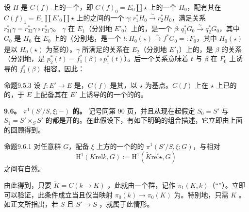设 $H$ 是 $C(f)$ 上的一个，即 $C(f)_0=E_0\amalg\star$ 上的一个 $H_0$，配有其在 $C(f)_1=E_1\amalg E'_0\amalg\star$ 上的之间的一个 $\gamma:r_1^*H_0\xrightarrow\sim r_2^*H_0$，满足关系 $r_{31}^*\gamma=r_{32}^*\gamma\circ r_{21}^*\gamma$。
 $\gamma$ 在 $E_1$（分别地 $E'_0$）上的，是一个 $\beta:q_1^*G_0\xrightarrow\sim q_2^*G_0$，其中 $G_0$ 是 $H_0$ 在 $E_0$ 上的（分别地，是一个 $t:\underline{H_0(\star)}\xrightarrow\sim f^*G_0=:F_0$，其中 $\underline{H_0(\star)}$ 是以 $H_0(\star)$ 为茎的）。$\gamma$ 所满足的关系在 $E_2$（分别地 $E'_1$）上的，是 $\beta$ 的关系（分别地，是 $p_2^*(t)=f_1^*(\beta)\circ p_1^*(t)$）。后一个关系意味着 $t$ 与 $\beta$ 在 $F_0$ 上诱导的 $f_1^*(\beta)$ 相容。因此：
\begin{SGAresult}{命题}{9.5.3}
设 $f:E'\to E$ 是，$C(f)$ 是其，以 $\star$ 为基点。$C(f)$ 上在 $\star$ 上已的的，于 $E$ 上配备其在 $E'$ 上诱导的的一个的的。
\end{SGAresult}

\textbf{9.6。 $\pi^1(S'/S,\xi;-)$ 的。} 记号同第 90 页，并且从现在起假定 $S_0=S'$ 与 $S_1=S'\times_SS'$ 的都是开的。在此假设下，有如下明确的组合描述，它立即由上面的回顾得到。
\begin{SGAresult}{命题}{9.6.1}
对任意群 $G$，配备 $\xi$ 上方的一个的的 $\pi^1(S'/S,\xi;G)$，与相对
\[
\mathrm H^1(K\mathrel{\mathrm{rel}}k,G):=\mathrm H^1(\widetilde K\mathrel{\mathrm{rel}}\star,G)
\]
之间有自然。
\end{SGAresult}
由此得到，只要 $\widetilde K=C(k\to K)$ ，此就由一个群，记作 $\pi_1(K,k)$（“”）。立即可以验证，此条件成立当且仅当映射 $\pi_0(k)\to\pi_0(K)$ 为。特别地，只需 $K$ 。如正文所指出，若 $S$ 且 $S'\to S$ ，就属于此情形。

